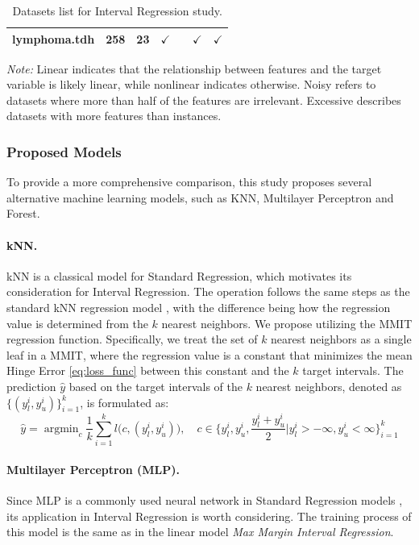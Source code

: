 \documentclass[12pt]{article}
\DeclareMathOperator*{\argmin}{argmin}
\begin{document}
\begin{table}[!t]
\begin{tabular}{l|l|l|c|c|c|c}
lymphoma.tdh                                 & 258                                           & 23                                             &$\checkmark$       &            &$\checkmark$     &$\checkmark$        
\\\bottomrule
\end{tabular}
\caption{Datasets list for Interval Regression study.}
\label{tab:datasets_reg}
\vspace{2mm}
\small
\justifying
\textit{Note:} Linear indicates that the relationship between features and the target variable is likely linear, while nonlinear indicates otherwise. 
Noisy refers to datasets where more than half of the features are irrelevant. 
Excessive describes datasets with more features than instances.
\end{table}


\subsubsection{Proposed Models}
To provide a more comprehensive comparison, this study proposes several alternative machine learning models, such as KNN, Multilayer Perceptron and Forest.
\paragraph{kNN.} kNN is a classical model for Standard Regression, which motivates its consideration for Interval Regression.
The operation follows the same steps as the standard kNN regression model \citep{knn}, with the difference being how the regression value is determined from the \( k \) nearest neighbors.
We propose utilizing the MMIT regression function. 
Specifically, we treat the set of \( k \) nearest neighbors as a single leaf in a MMIT, where the regression value is a constant that minimizes the mean Hinge Error \eqref{eq:loss_func} between this constant and the \( k \) target intervals.
The prediction $\hat{y}$ based on the target intervals of the \( k \) nearest neighbors, denoted as \( \{(y_l^i, y_u^i)\}_{i=1}^k \), is formulated as:
\[
    \hat{y} = \argmin_c \frac{1}{k} \sum_{i=1}^{k} l\big(c, (y_l^i, y_u^i)\big), \quad c \in \{y_l^i, y_u^i, \frac{y_l^i + y_u^i}{2}|y_l^i > -\infty, y_u^i < \infty\}_{i = 1}^k
\]


\paragraph{Multilayer Perceptron (MLP).} Since MLP is a commonly used neural network in Standard Regression models \citep{uni_approximator}, its application in Interval Regression is worth considering.
The training process of this model is the same as in the linear model \textit{Max Margin Interval Regression}.
\end{document}
